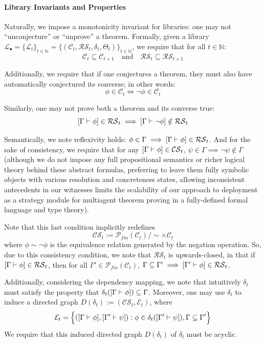 \paragraph{Library Invariants and Properties}

Naturally, we impose a monotonicity invariant for libraries: one may not ``unconjecture'' or ``unprove'' a theorem. Formally, given a library $\mathcal{L}_\bullet = \{\mathcal{L}_t\}_{t \in \mathbb{N}}=\{(\mathcal{C}_t,\mathcal{RS}_t,\delta_t,\Theta_t)\}_{t \in \mathbb{N}}$, we require that for all $t \in \mathbb{N}$:
\[\mathcal{C}_{t} \subseteq \mathcal{C}_{t+1} \quad \text{and} \quad \mathcal{RS}_{t} \subseteq \mathcal{RS}_{t+1}\]

Additionally, we require that if one conjectures a theorem, they must also have automatically conjectured its converse; in other words:
\[\phi \in \mathcal{C}_t \iff \neg\phi \in \mathcal{C}_t\]

Similarly, one may not prove both a theorem and its converse true: 
\[[\Gamma \vdash \phi] \in \mathcal{RS}_t \implies [\Gamma \vdash \neg \phi] \notin \mathcal{RS}_t\]

Semantically, we note reflexivity holds: $\phi \in \Gamma \implies [\Gamma \vdash \phi] \in \mathcal{RS}_t$. And for the sake of consistency, we require that for any $[\Gamma \vdash \phi] \in \mathcal{CS}_t$, $\psi \in \Gamma \implies \neg\psi \notin \Gamma$ (although we do not impose any full propositional semantics or richer logical theory behind these abstract formulas, preferring to leave them fully symbolic objects with various resolution and concreteness states, allowing inconsistent antecedents in our witnesses limits the scalability of our approach to deployment as a strategy module for multiagent theorem proving in a fully-defined formal language and type theory). 

Note that this last condition implicitly redefines
\[\mathcal{CS}_t := \mathcal{P}_{fin}(\mathcal{C}_t)/\sim \times \mathcal{C}_t \] where $\phi\sim\neg\phi$ is the equivalence relation generated by the negation operation. So, due to this consistency condition, we note that $\mathcal{RS}_t$ is upwards-closed, in that if $[\Gamma \vdash \phi] \in \mathcal{RS}_t$, then for all $\Gamma' \in \mathcal{P}_{fin}(\mathcal{C}_t)$, $\Gamma \subseteq \Gamma' \implies [\Gamma'\vdash\phi]\in \mathcal{RS}_t$.

Additionally, considering the dependency mapping, we note that intuitively $\delta_t$ must satisfy the property that $\delta_t([\Gamma \vdash \phi]) \subseteq \Gamma$. Moreover, one may use $\delta_t$ to induce a directed graph $D(\delta_t) := (\mathcal{CS}_t,\mathcal{E}_t)$, where 
\[\mathcal{E}_t = \Big\{([\Gamma\vdash \phi], [\Gamma' \vdash \psi]) : \phi \in \delta_t([\Gamma' \vdash \psi]), \Gamma\subseteq \Gamma'\Big\}\]
We require that this induced directed graph $D(\delta_t)$ of $\delta_t$ must be acyclic.

